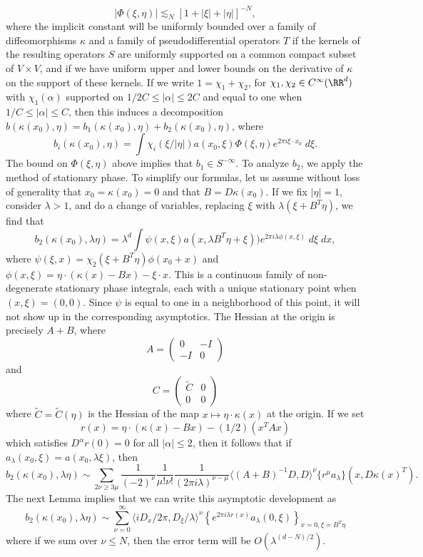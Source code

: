 %
\[ |\Phi(\xi,\eta)| \lesssim_N [1 + |\xi| + |\eta|]^{-N}, \]
%
where the implicit constant will be uniformly bounded over a family of diffeomorphisms $\kappa$ and a family of pseudodifferential operators $T$ if the kernels of the resulting operators $S$ are uniformly supported on a common compact subset of $V \times V$, and if we have uniform upper and lower bounds on the derivative of $\kappa$ on the support of these kernels. If we write $1 = \chi_1 + \chi_2$, for $\chi_1,\chi_2 \in C^\infty(\RR^d)$ with $\chi_1(\alpha)$ supported on $1/2C \leq |\alpha| \leq 2C$ and equal to one when $1/C \leq |\alpha| \leq C$, then this induces a decomposition $b(\kappa(x_0),\eta) = b_1(\kappa(x_0),\eta) + b_2(\kappa(x_0),\eta)$, where
%
\[ b_i(\kappa(x_0),\eta) = \int \chi_i(\xi/|\eta|) a(x_0,\xi) \Phi(\xi,\eta) e^{2 \pi i \xi \cdot x_0}\; d\xi. \]
%
The bound on $\Phi(\xi,\eta)$ above implies that $b_1 \in S^{-\infty}$. To analyze $b_2$, we apply the method of stationary phase. To simplify our formulas, let us assume without loss of generality that $x_0 = \kappa(x_0) = 0$ and that $B = D\kappa(x_0)$. If we fix $|\eta| = 1$, consider $\lambda > 1$, and do a change of variables, replacing $\xi$ with $\lambda (\xi + B^T \eta)$, we find that
%
\[ b_2(\kappa(x_0),\lambda \eta) = \lambda^d \int \psi(x,\xi) a(x,\lambda B^T \eta + \xi)) e^{2 \pi i \lambda \phi(x,\xi)}\; d\xi\; dx, \]
%
where $\psi(\xi,x) = \chi_2(\xi + B^T \eta) \phi(x_0 + x)$ and $\phi(x,\xi) = \eta \cdot (\kappa(x) - Bx) - \xi \cdot x$. This is a continuous family of non-degenerate stationary phase integrals, each with a unique stationary point when $(x,\xi) = (0,0)$. Since $\psi$ is equal to one in a neighborhood of this point, it will not show up in the corresponding asymptotics. The Hessian at the origin is precisely $A + B$, where
%
\[ A = \begin{pmatrix} 0 & -I \\ -I & 0 \end{pmatrix} \]
%
and
%
\[ C = \begin{pmatrix} \tilde{C} & 0 \\ 0 & 0 \end{pmatrix} \]
%
where $\tilde{C} = \tilde{C}(\eta)$ is the Hessian of the map $x \mapsto \eta \cdot \kappa(x)$ at the origin. If we set
%
\[ r(x) = \eta \cdot (\kappa(x) - Bx) - (1/2)(x^T A x) \]
%
which satisfies $D^\alpha r(0) = 0$ for all $|\alpha| \leq 2$, then it follows that if $a_\lambda(x_0,\xi) = a(x_0,\lambda \xi)$, then
\[ b_2(\kappa(x_0),\lambda \eta) \sim \sum_{2 \nu \geq 3 \mu} \frac{1}{(-2)^\nu} \frac{1}{\mu! \nu!} \frac{1}{(2\pi i \lambda)^{\nu - \mu}} \langle (A + B)^{-1} D, D \rangle^\nu \{ r^\mu a_\lambda \}(x, D\kappa(x)^T). \]
%
The next Lemma implies that we can write this asymptotic development as
%
\[ b_2(\kappa(x_0),\lambda \eta) \sim \sum_{\nu = 0}^\infty \langle i D_x / 2\pi, D_\xi / \lambda \rangle^\nu \left\{ e^{2 \pi i \lambda r(x)} a_\lambda(0,\xi) \right\}_{x = 0, \xi = B^T \eta} \]
%
where if we sum over $\nu \leq N$, then the error term will be $O(\lambda^{(d-N)/2})$.

